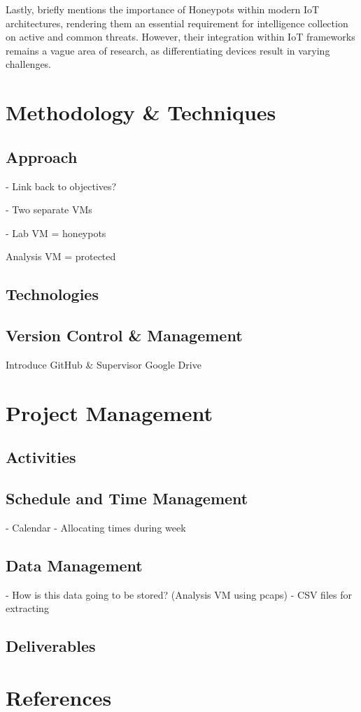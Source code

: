 \documentclass[a4paper,12pt,oneside]{book}			%
\begin{document}
Lastly, \textit{\citep{crowdstrike-honeypot}} briefly mentions the importance of Honeypots within modern IoT architectures, rendering them an essential requirement for intelligence collection on active and common threats. However, their integration within IoT frameworks remains a vague area of research, as differentiating devices result in varying challenges.

\chapter{Methodology \&{} Techniques}\label{ch:methods}
\section{Approach}\label{sec:approach}
- Link back to objectives?

- Two separate VMs

- Lab VM = honeypots

Analysis VM = protected

\section{Technologies}\label{sec:technologies}
\section{Version Control \&{} Management}\label{sec:versionControl}
Introduce GitHub \&{} Supervisor Google Drive


\chapter{Project Management}\label{ch:project management}
\section{Activities}\label{sec:activities}
\section{Schedule and Time Management}\label{sec:time management}
- Calendar
- Allocating times during week
\section{Data Management}\label{sec:data management}
- How is this data going to be stored? (Analysis VM using pcaps)
- CSV files for extracting
\section{Deliverables}\label{sec: deliverables}



\chapter{References}

\printbibliography
\end{document}
